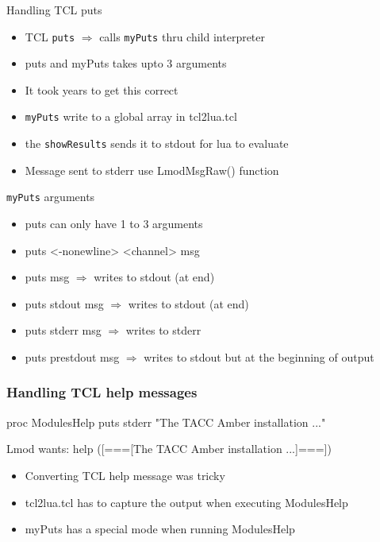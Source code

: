 \documentclass{beamer}
\begin{document}
\begin{frame}{Handling TCL puts}
  \begin{itemize}
    \item TCL \texttt{puts} $\Rightarrow$ calls \texttt{myPuts} thru child interpreter
    \item puts and myPuts takes upto 3 arguments
    \item It took years to get this correct
    \item \texttt{myPuts} write to a global array in tcl2lua.tcl
    \item the \texttt{showResults} sends it to stdout for lua to
      evaluate
    \item Message sent to stderr use LmodMsgRaw() function
  \end{itemize}
\end{frame}

\begin{frame}{\texttt{myPuts} arguments}
  \begin{itemize}
     \item puts can only have 1 to 3 arguments
     \item puts <-nonewline> <channel> msg
     \item puts msg           $\Rightarrow$ writes to stdout (at end)
     \item puts stdout msg    $\Rightarrow$ writes to stdout (at end)
     \item puts stderr msg    $\Rightarrow$ writes to stderr
     \item puts prestdout msg $\Rightarrow$ writes to stdout but at the beginning of output
  \end{itemize}
\end{frame}


\begin{frame}[fragile]
    \frametitle{Handling TCL help messages}
 {\tiny
    \begin{semiverbatim}
proc ModulesHelp { } {
    puts stderr "The TACC Amber installation ..."
}

Lmod wants:
help ([===[The TACC Amber installation ...]===])
    \end{semiverbatim}
}
  \begin{itemize}
    \item Converting TCL help message was tricky
    \item tcl2lua.tcl has to capture the output when executing
      ModulesHelp
    \item myPuts has a special mode when running ModulesHelp
  \end{itemize}

\end{frame}
\end{document}
